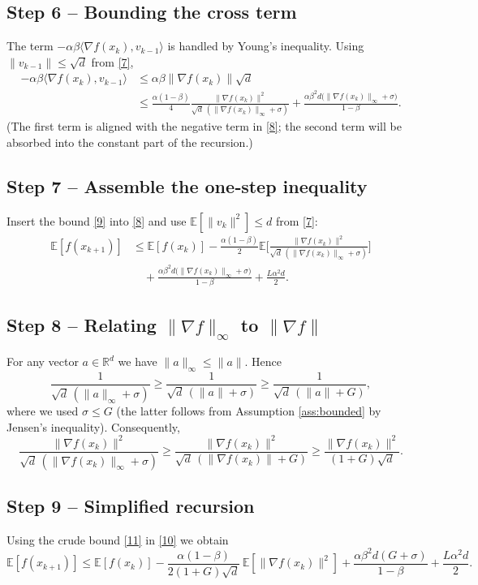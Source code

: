 \documentclass{article}
\newcommand{\E}{\mathbb{E}}
\newcommand{\R}{\mathbb{R}}
\begin{document}
\subsection*{Step 6 – Bounding the cross term}
The term $-\alpha\beta\langle\nabla f(x_k),v_{k-1}\rangle$ is handled by Young’s
inequality. Using $\|v_{k-1}\|\le\sqrt{d}$ from \eqref{7},
\[
\begin{aligned}
-\alpha\beta\langle\nabla f(x_k),v_{k-1}\rangle
&\le \alpha\beta\|\nabla f(x_k)\|\sqrt{d}\\
&\le
   \frac{\alpha(1-\beta)}{4}
   \frac{\|\nabla f(x_k)\|^{2}}{\sqrt{d}\,(\|\nabla f(x_k)\|_{\infty}+ \sigma)}
   +\frac{\alpha\beta^{2}d\big(\|\nabla f(x_k)\|_{\infty}+ \sigma\big)}{1-\beta}.
\end{aligned}
\tag{9}
\]
(The first term is aligned with the negative term in \eqref{8}; the second
term will be absorbed into the constant part of the recursion.)

\subsection*{Step 7 – Assemble the one‑step inequality}
Insert the bound \eqref{9} into \eqref{8} and use $\E[\|v_k\|^{2}]\le d$ from
\eqref{7}:
\[
\begin{aligned}
\E[f(x_{k+1})]
&\le \E[f(x_k)]
   -\frac{\alpha(1-\beta)}{2}
    \E\!\Big[\frac{\|\nabla f(x_k)\|^{2}}
                 {\sqrt{d}\,(\|\nabla f(x_k)\|_{\infty}+ \sigma)}\Big] \\
&\quad +\frac{\alpha\beta^{2}d\big(\|\nabla f(x_k)\|_{\infty}+ \sigma\big)}{1-\beta}
   +\frac{L\alpha^{2}d}{2}.
\end{aligned}
\tag{10}
\]

\subsection*{Step 8 – Relating $\|\nabla f\|_{\infty}$ to $\|\nabla f\|$}
For any vector $a\in\R^{d}$ we have $\|a\|_{\infty}\le\|a\|$. Hence
\[
\frac{1}{\sqrt{d}\,(\|a\|_{\infty}+ \sigma)}
\ge
\frac{1}{\sqrt{d}\,(\|a\|+ \sigma)}
\ge
\frac{1}{\sqrt{d}\,(\|a\|+ G)} ,
\]
where we used $\sigma\le G$ (the latter follows from Assumption \ref{ass:bounded} by Jensen’s inequality).
Consequently,
\[
\frac{\|\nabla f(x_k)\|^{2}}
     {\sqrt{d}\,(\|\nabla f(x_k)\|_{\infty}+ \sigma)}
\ge
\frac{\|\nabla f(x_k)\|^{2}}{\sqrt{d}\,(\|\nabla f(x_k)\|+ G)}
\ge
\frac{\|\nabla f(x_k)\|^{2}}{(1+G)\sqrt{d}} .
\tag{11}
\]

\subsection*{Step 9 – Simplified recursion}
Using the crude bound \eqref{11} in \eqref{10} we obtain
\[
\E[f(x_{k+1})]
\le \E[f(x_k)]
   -\frac{\alpha(1-\beta)}{2(1+G)\sqrt{d}}\,
     \E[\|\nabla f(x_k)\|^{2}]
   +\frac{\alpha\beta^{2}d(G+\sigma)}{1-\beta}
   +\frac{L\alpha^{2}d}{2}.
\tag{12}
\]
\end{document}
